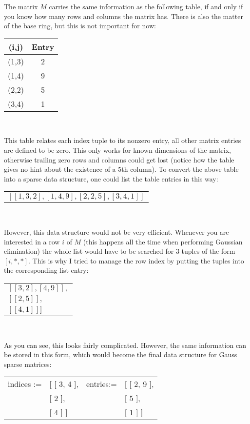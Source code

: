 \documentclass[a4paper,11pt]{report}
\begin{document}
{{ The matrix $M$ carries the same information as the following table, if and only if you know
how many rows and columns the matrix has. There is also the matter of the base
ring, but this is not important for now: \begin{center}
\begin{tabular}{|cc|}\hline
(i,j)&
Entry\\
\hline
(1,3)&
2\\
(1,4)&
9\\
(2,2)&
5\\
(3,4)&
1\\
\hline
\end{tabular}\\[2mm]
\end{center}

 This table relates each index tuple to its nonzero entry, all other matrix
entries are defined to be zero. This only works for known dimensions of the
matrix, otherwise trailing zero rows and columns could get lost (notice how
the table gives no hint about the existence of a 5th column). To convert the
above table into a sparse data structure, one could list the table entries in
this way:

 \begin{center}
\begin{tabular}{c}$[ [ 1, 3, 2 ], [ 1, 4, 9 ], [ 2, 2, 5 ], [ 3, 4, 1 ] ]$\\
\end{tabular}\\[2mm]
\end{center}

 However, this data structure would not be very efficient. Whenever you are
interested in a row $i$ of $M$ (this happens all the time when performing Gaussian elimination) the whole
list would have to be searched for 3-tuples of the form $[ i, *, * ]$. This is why I tried to manage the row index by putting the tuples into the
corresponding list entry:\\
 \begin{center}
\begin{tabular}{l}$[ [ 3, 2 ], [ 4, 9 ] ],$\\
$[ [ 2, 5 ] ],$\\
$[ [ 4, 1 ] ] ]$\\
\end{tabular}\\[2mm]
\end{center}

 As you can see, this looks fairly complicated. However, the same information
can be stored in this form, which would become the final data structure for \textsf{Gauss} sparse matrices: \begin{center}
\begin{tabular}{clcl}indices :=&
[ [ 3, 4 ],&
entries:=&
[ [ 2, 9 ],\\
&
 [ 2 ],&
&
 [ 5 ],\\
&
 [ 4 ] ]&
&
 [ 1 ] ]\\
\end{tabular}\\[2mm]
\end{center}

}}
\end{document}
